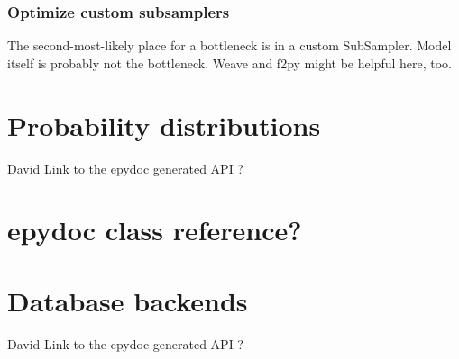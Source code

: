 \documentclass[]{book}
\begin{document}
\subsection{Optimize custom subsamplers}\label{sub:optimize_custom_subsamplers}
The second-most-likely place for a bottleneck is in a custom SubSampler. Model itself is probably not the bottleneck. Weave and f2py might be helpful here, too.





\appendix

\chapter{Probability distributions}
David
Link to the epydoc generated API ?
%
\chapter{epydoc class reference?}

\chapter{Database backends}
David
Link to the epydoc generated API ?
\end{document}
